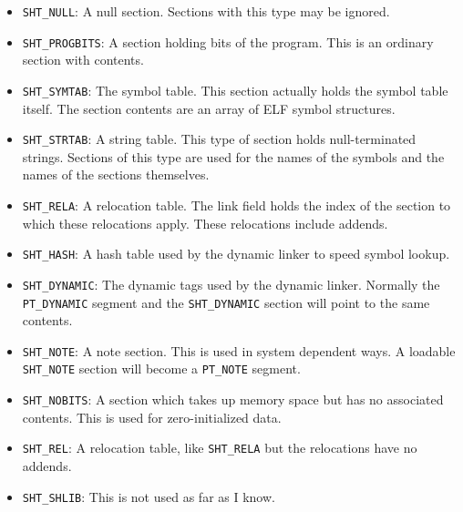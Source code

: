 \begin{itemize}

    \item \texttt{SHT\_NULL}: A null section.  Sections with this type may be
          ignored.

    \item \texttt{SHT\_PROGBITS}: A section holding bits of the program.  This is
          an ordinary section with contents.

    \item \texttt{SHT\_SYMTAB}: The symbol table.  This section actually holds the
          symbol table itself.  The section contents are an array of ELF symbol
          structures.

    \item \texttt{SHT\_STRTAB}: A string table.  This type of section holds
          null-terminated strings.  Sections of this type are used for the
          names of the symbols and the names of the sections themselves.

    \item \texttt{SHT\_RELA}: A relocation table.  The link field holds the index
          of the section to which these relocations apply.  These relocations
          include addends.

    \item \texttt{SHT\_HASH}: A hash table used by the dynamic linker to speed
          symbol lookup.

    \item \texttt{SHT\_DYNAMIC}: The dynamic tags used by the dynamic linker.
          Normally the \texttt{PT\_DYNAMIC} segment and the \texttt{SHT\_DYNAMIC}
          section will point to the same contents.

    \item \texttt{SHT\_NOTE}: A note section.  This is used in system dependent
          ways.  A loadable \texttt{SHT\_NOTE} section will become a
          \texttt{PT\_NOTE} segment.

    \item \texttt{SHT\_NOBITS}: A section which takes up memory space but has no
          associated contents.  This is used for zero-initialized data.

    \item \texttt{SHT\_REL}: A relocation table, like \texttt{SHT\_RELA} but the
          relocations have no addends.

    \item \texttt{SHT\_SHLIB}: This is not used as far as I know.


\end{itemize}
